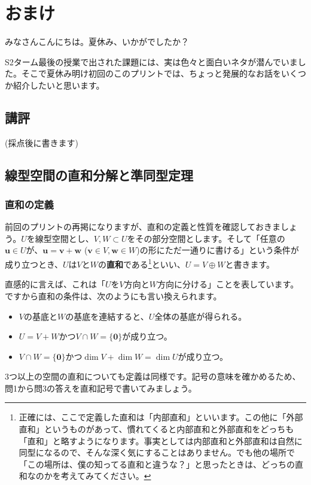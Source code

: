 \chapter{おまけ}

みなさんこんにちは。夏休み、いかがでしたか？

S2ターム最後の授業で出された課題には、実は色々と面白いネタが潜んでいました。そこで夏休み明け初回のこのプリントでは、ちょっと発展的なお話をいくつか紹介したいと思います。

\section{講評}

(採点後に書きます)

\section{線型空間の直和分解と準同型定理}

\subsection{直和の定義}

前回のプリントの再掲になりますが、直和の定義と性質を確認しておきましょう。$U$を線型空間とし、$V, W\subset U$をその部分空間とします。そして「任意の$\bm{u} \in U$が、$\bm{u} = \bm{v} + \bm{w}$ ($\bm{v} \in V, \bm{w}\in W$)の形にただ一通りに書ける」という条件が成り立つとき、$U$は$V$と$W$の\textbf{直和}である\footnote{正確には、ここで定義した直和は「内部直和」といいます。この他に「外部直和」というものがあって、慣れてくると内部直和と外部直和をどっちも「直和」と略すようになります。事実としては内部直和と外部直和は自然に同型になるので、そんな深く気にすることはありません。でも他の場所で「この場所は、僕の知ってる直和と違うな？」と思ったときは、どっちの直和なのかを考えてみてください。}といい、$U = V \oplus W$と書きます。

直感的に言えば、これは「$U$を$V$方向と$W$方向に分ける」ことを表しています。ですから直和の条件は、次のようにも言い換えられます。
\begin{itemize}
\item $V$の基底と$W$の基底を連結すると、$U$全体の基底が得られる。
\item $U = V + W$かつ$V\cap W = \{\bm{0}\}$が成り立つ。
\item $V \cap W = \{\bm{0}\}$かつ$\dim V + \dim W = \dim U$が成り立つ。
\end{itemize}
$3$つ以上の空間の直和についても定義は同様です。記号の意味を確かめるため、問1から問3の答えを直和記号で書いてみましょう。	

